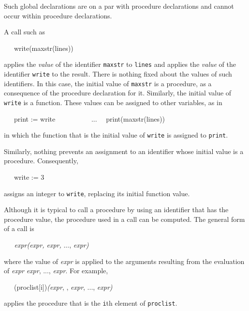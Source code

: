 Such global declarations are on a par with procedure declarations and
cannot occur within procedure declarations.

A call such as

{\ttfamily\mdseries
\ \ \ write(maxstr(lines))}

\noindent
applies the \textit{value} of the identifier \texttt{maxstr} to
\texttt{lines} and applies the \textit{value} of the identifier
\texttt{write} to the result. There is nothing fixed about the values
of such identifiers. In this case, the initial value of
\texttt{maxstr} is a procedure, as a consequence of the procedure
declaration for it. Similarly, the initial value of \texttt{write} is
a function. These values can be assigned to other variables, as in

{\ttfamily\mdseries
\ \ \ print := write\newline
 \ \ \ \ \ \ \ \ \ \ ...\newline
 \ \ \textrm{print(maxstr(lines))}}

\noindent in which the function that is the initial value of
\texttt{write} is assigned to \texttt{print}.

Similarly, nothing prevents an assignment to an identifier whose
initial value is a procedure. Consequently,

{\ttfamily\mdseries
\ \ \ write := 3}

\noindent
assigns an integer to \texttt{write}, replacing its initial function value.

Although it is typical to call a procedure by using an identifier that
has the procedure value, the procedure used in a call can be
computed. The general form of a call is

{\ttfamily\mdseries
\textit{\ \ \ expr}\textit{}\textit{(expr}\textit{}\textit{,
expr}\textit{}\textit{, }..., \textit{expr}\textit{}\textit{)}}

\noindent where the value of
\textit{expr} is applied to the
arguments resulting from the evaluation of
\textit{expr}
\textit{expr}, ...,
\textit{expr}. For example,

{\ttfamily\mdseries
\ \ \ (proclist[i])\textit{(expr}, ,
\textit{expr},
..., \textit{expr)}}

\noindent
applies the procedure that is the \texttt{i}th element of \texttt{proclist}.

